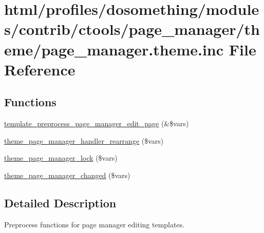 \hypertarget{page__manager_8theme_8inc}{
\section{html/profiles/dosomething/modules/contrib/ctools/page\_\-manager/theme/page\_\-manager.theme.inc File Reference}
\label{page__manager_8theme_8inc}
}
\subsection*{Functions}
\begin{DoxyCompactItemize}
\item 
\hyperlink{page__manager_8theme_8inc_a6be997a57b223692c17941e22101dfc7}{template\_\-preprocess\_\-page\_\-manager\_\-edit\_\-page} (\&\$vars)
\item 
\hyperlink{page__manager_8theme_8inc_a5f6d18d0708a8144666d23523e2a85e1}{theme\_\-page\_\-manager\_\-handler\_\-rearrange} (\$vars)
\item 
\hyperlink{page__manager_8theme_8inc_a8bf60472dc388c02c9102d5fe989a48e}{theme\_\-page\_\-manager\_\-lock} (\$vars)
\item 
\hyperlink{page__manager_8theme_8inc_a78f3795dbc9a497962966a38e1c4d3aa}{theme\_\-page\_\-manager\_\-changed} (\$vars)
\end{DoxyCompactItemize}


\subsection{Detailed Description}
Preprocess functions for page manager editing templates. 

